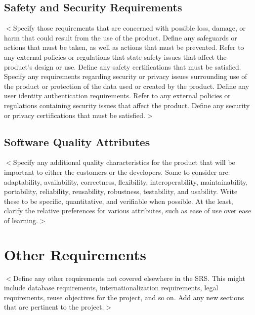 \documentclass{scrreprt}
\begin{document}
\section{Safety and Security Requirements}
$<$Specify those requirements that are concerned with possible loss, damage, or
harm that could result from the use of the product. Define any safeguards or
actions that must be taken, as well as actions that must be prevented. Refer to
any external policies or regulations that state safety issues that affect the
product’s design or use. Define any safety certifications that must be
satisfied.
Specify any requirements regarding security or privacy issues surrounding use
of the product or protection of the data used or created by the product. Define
any user identity authentication requirements. Refer to any external policies or
regulations containing security issues that affect the product. Define any
security or privacy certifications that must be satisfied.$>$

\section{Software Quality Attributes}
$<$Specify any additional quality characteristics for the product that will be
important to either the customers or the developers. Some to consider are:
adaptability, availability, correctness, flexibility, interoperability,
maintainability, portability, reliability, reusability, robustness, testability,
and usability. Write these to be specific, quantitative, and verifiable when
possible. At the least, clarify the relative preferences for various attributes,
such as ease of use over ease of learning.$>$

\chapter{Other Requirements}
$<$Define any other requirements not covered elsewhere in the SRS. This might
include database requirements, internationalization requirements, legal
requirements, reuse objectives for the project, and so on. Add any new sections
that are pertinent to the project.$>$
\end{document}
